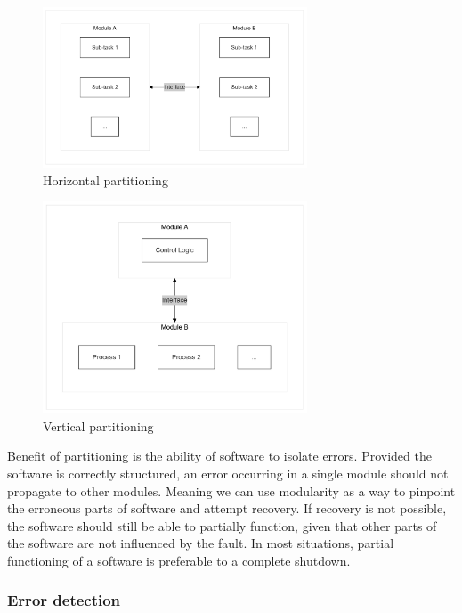 \documentclass[12pt, letterpaper]{article}
\begin{document}
\begin{figure}[hbt!]
    \centering
    \includegraphics[width=0.7\textwidth]{modularity/horizontal.png}
    \caption{Horizontal partitioning}
    \label{fig:mod_hor}
\end{figure}

\begin{figure}[hbt!]
    \centering
    \includegraphics[width=0.7\textwidth]{modularity/vertical.png}
    \caption{Vertical partitioning}
    \label{fig:mod_ver}
\end{figure}

Benefit of partitioning is the ability of software to isolate errors. Provided the software is correctly structured, an error occurring in a single module should not propagate to other modules. Meaning we can use modularity as a way to pinpoint the erroneous parts of software and attempt recovery. If recovery is not possible, the software should still be able to partially function, given that other parts of the software are not influenced by the fault. In most situations, partial functioning of a software is preferable to a complete shutdown.

\subsubsection{Error detection}
\end{document}
